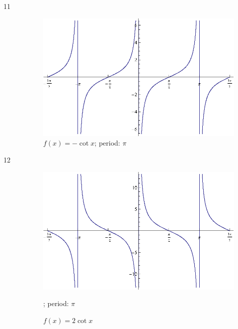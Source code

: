 \documentclass{exam}
\begin{document}
\begin{description}
      \item[11]
        \begin{figure}[H]
          \centering
          \includegraphics[scale=0.9]{exercise11.eps}
          \caption{$f(x) = - \cot x$; period: $\pi$}
        \end{figure}

      \item[12]
        \begin{figure}[H]
          \centering
          \includegraphics[scale=0.9]{exercise12.eps}
          \caption{$f(x) = 2 \cot x$}; period: $\pi$
        \end{figure}


\end{description}
\end{document}
